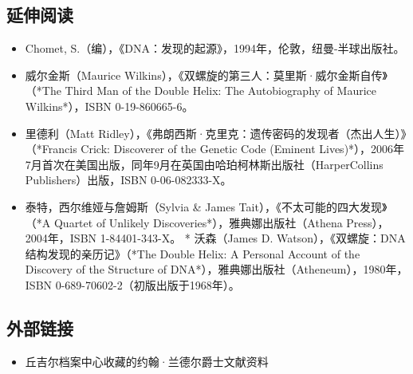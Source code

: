 \subsection{延伸阅读}
\begin{itemize}
\item Chomet, S.（编），《DNA：发现的起源》，1994年，伦敦，纽曼-半球出版社。
\item 威尔金斯（Maurice Wilkins），《双螺旋的第三人：莫里斯·威尔金斯自传》（*The Third Man of the Double Helix: The Autobiography of Maurice Wilkins*），ISBN 0-19-860665-6。
\item 里德利（Matt Ridley），《弗朗西斯·克里克：遗传密码的发现者（杰出人生）》（*Francis Crick: Discoverer of the Genetic Code (Eminent Lives)*），2006年7月首次在美国出版，同年9月在英国由哈珀柯林斯出版社（HarperCollins Publishers）出版，ISBN 0-06-082333-X。
\item 泰特，西尔维娅与詹姆斯（Sylvia & James Tait），《不太可能的四大发现》（*A Quartet of Unlikely Discoveries*），雅典娜出版社（Athena Press），2004年，ISBN 1-84401-343-X。
* 沃森（James D. Watson），《双螺旋：DNA结构发现的亲历记》（*The Double Helix: A Personal Account of the Discovery of the Structure of DNA*），雅典娜出版社（Atheneum），1980年，ISBN 0-689-70602-2（初版出版于1968年）。
\end{itemize}

\subsection{外部链接}
\begin{itemize}
\item 丘吉尔档案中心收藏的约翰·兰德尔爵士文献资料
\end{itemize}
